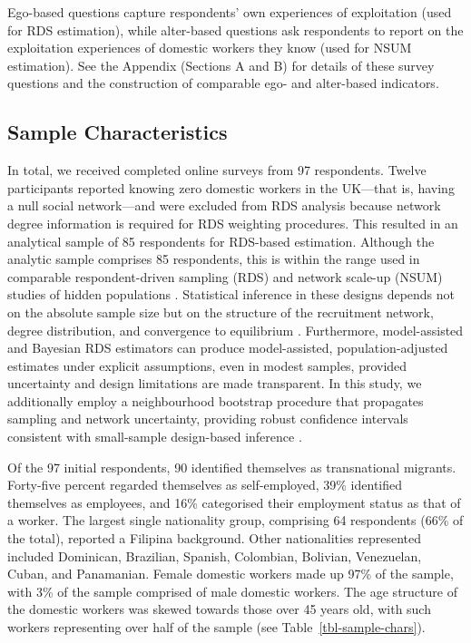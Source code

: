 \documentclass[
  12pt,
  letterpaper,
  DIV=11,
  numbers=noendperiod]{scrartcl}
\begin{document}
Ego-based questions capture respondents' own experiences of exploitation
(used for RDS estimation), while alter-based questions ask respondents
to report on the exploitation experiences of domestic workers they know
(used for NSUM estimation). See the Appendix (Sections A and B) for
details of these survey questions and the construction of comparable
ego- and alter-based indicators.

\subsection{Sample Characteristics}\label{sec-sample-characteristics}

In total, we received completed online surveys from 97 respondents.
Twelve participants reported knowing zero domestic workers in the
UK---that is, having a null social network---and were excluded from RDS
analysis because network degree information is required for RDS
weighting procedures. This resulted in an analytical sample of 85
respondents for RDS-based estimation. Although the analytic sample
comprises 85 respondents, this is within the range used in comparable
respondent-driven sampling (RDS) and network scale-up (NSUM) studies of
hidden populations
\autocite{gile10-respondentdriven,goel10-assessing,gile11-improved}.
Statistical inference in these designs depends not on the absolute
sample size but on the structure of the recruitment network, degree
distribution, and convergence to equilibrium \autocite{salg04-sampling}.
Furthermore, model-assisted and Bayesian RDS estimators
\autocite{gile11-improved,gile18-methods} can produce model-assisted,
population-adjusted estimates under explicit assumptions, even in modest
samples, provided uncertainty and design limitations are made
transparent. In this study, we additionally employ a neighbourhood
bootstrap procedure that propagates sampling and network uncertainty,
providing robust confidence intervals consistent with small-sample
design-based inference \autocite{hand14-estimating}.

Of the 97 initial respondents, 90 identified themselves as transnational
migrants. Forty-five percent regarded themselves as self-employed, 39\%
identified themselves as employees, and 16\% categorised their
employment status as that of a worker. The largest single nationality
group, comprising 64 respondents (66\% of the total), reported a
Filipina background. Other nationalities represented included Dominican,
Brazilian, Spanish, Colombian, Bolivian, Venezuelan, Cuban, and
Panamanian. Female domestic workers made up 97\% of the sample, with 3\%
of the sample comprised of male domestic workers. The age structure of
the domestic workers was skewed towards those over 45 years old, with
such workers representing over half of the sample (see
Table~\ref{tbl-sample-chars}).
\end{document}
